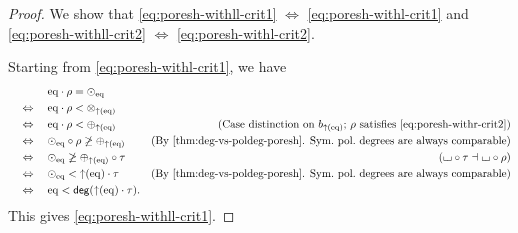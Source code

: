 \documentclass[a4paper]{memoir}
\begin{document}
\begin{proof}
	We show that \cref{eq:poresh-withll-crit1} $\Leftrightarrow$ \cref{eq:poresh-withl-crit1} and \cref{eq:poresh-withll-crit2} $\Leftrightarrow$ \cref{eq:poresh-withl-crit2}.
	
	Starting from \cref{eq:poresh-withl-crit1}, we have
	\begin{align*}
		&\quad\mathrel{\phantom{\Leftrightarrow}}\quad
		\eqtydeg \cdot \rho = \nonpol_\eqtydeg \\
		&\quad\Leftrightarrow\quad
		\eqtydeg \cdot \rho < \mixpol_{\sucdeg(\eqtydeg)} \\
		&\quad\Leftrightarrow\quad
		\eqtydeg \cdot \rho < \pospol_{\sucdeg(\eqtydeg)}
		& \text{(Case distinction on $b_{\sucdeg(\eqtydeg)}$; $\rho$ satisfies \cref{eq:poresh-withr-crit2})} \\
		&\quad\Leftrightarrow\quad
		\nonpol_\eqtydeg \circ \rho \not\geq \pospol_{\sucdeg(\eqtydeg)}
		& \text{(By \cref{thm:deg-vs-poldeg-poresh}. Sym.\ pol.\ degrees are always comparable)} \\
		&\quad\Leftrightarrow\quad
		\nonpol_\eqtydeg \not\geq \pospol_{\sucdeg(\eqtydeg)} \circ \tau
		& \text{($\loch \circ \tau \dashv \loch \circ \rho$)} \\
		&\quad\Leftrightarrow\quad
		\nonpol_\eqtydeg < {\sucdeg(\eqtydeg)} \cdot \tau
		& \text{(By \cref{thm:deg-vs-poldeg-poresh}. Sym.\ pol.\ degrees are always comparable)} \\
		&\quad\Leftrightarrow\quad
		\eqtydeg < \getdeg({\sucdeg(\eqtydeg)} \cdot \tau).
	\end{align*}
	This gives \cref{eq:poresh-withll-crit1}.
	

\end{proof}
\end{document}
